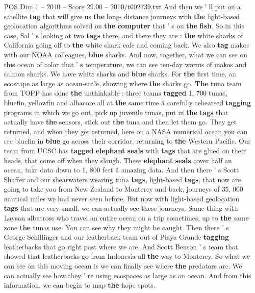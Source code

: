 \begin{textsample}{POS Dim 1 – 2010 – Score 29.00 – 2010/t002739.txt}
And then we ' ll put on a satellite \textbf{tag} that will give us \textbf{the} long- distance journeys with \textbf{the} light-based geolocation algorithms solved on \textbf{the} \textbf{computer} that ' s on \textbf{the} \textbf{fish}.
So in this case, Sal ' s looking at two \textbf{tags} there, and there they are : \textbf{the} white sharks of California going off to \textbf{the} white shark cafe and coming back.
We also \textbf{tag} makos with our NOAA colleagues, \textbf{blue} sharks.
And now, together, what we can see on this ocean of color that ' s temperature, we can see ten-day worms of makos and salmon sharks.
We have white sharks and \textbf{blue} sharks.
For \textbf{the} first time, an ecoscape as large as ocean-scale, showing where \textbf{the} sharks go. \textbf{The} tuna team from TOPP has done \textbf{the} unthinkable : three teams \textbf{tagged} 1, 700 tunas, bluefin, yellowfin and albacore all at \textbf{the} same time â carefully rehearsed \textbf{tagging} programs in which we go out, pick up juvenile tunas, put in \textbf{the} \textbf{tags} that actually have \textbf{the} sensors, stick out \textbf{the} tuna and then let them go.
They get returned, and when they get returned, here on a NASA numerical ocean you can see bluefin in \textbf{blue} go across their corridor, returning to \textbf{the} Western Pacific.
Our team from UCSC has \textbf{tagged} \textbf{elephant} \textbf{seals} with \textbf{tags} that are glued on their heads, that come off when they slough.
These \textbf{elephant} \textbf{seals} cover half an ocean, take data down to 1, 800 feet â amazing data.
And then there ' s Scott Shaffer and our shearwaters wearing tuna \textbf{tags}, light-based \textbf{tags}, that now are going to take you from New Zealand to Monterey and back, journeys of 35, 000 nautical miles we had never seen before.
But now with light-based geolocation \textbf{tags} that are very small, we can actually see these journeys.
Same thing with Laysan albatross who travel an entire ocean on a trip sometimes, up to \textbf{the} same zone \textbf{the} tunas use.
You can see why they might be caught.
Then there ' s George Schillinger and our leatherback team out of Playa Grande \textbf{tagging} leatherbacks that go right past where we are.
And Scott Benson ' s team that showed that leatherbacks go from Indonesia all \textbf{the} way to Monterey.
So what we can see on this moving ocean is we can finally see where \textbf{the} predators are.
We can actually see how they ' re using ecospaces as large as an ocean.
And from this information, we can begin to map \textbf{the} hope spots.

\end{textsample}
